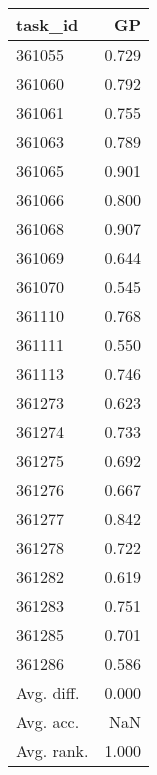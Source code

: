 \begin{tabular}{lr}
\toprule
task\_id & GP \\
\midrule
361055 & 0.729 \\
361060 & 0.792 \\
361061 & 0.755 \\
361063 & 0.789 \\
361065 & 0.901 \\
361066 & 0.800 \\
361068 & 0.907 \\
361069 & 0.644 \\
361070 & 0.545 \\
361110 & 0.768 \\
361111 & 0.550 \\
361113 & 0.746 \\
361273 & 0.623 \\
361274 & 0.733 \\
361275 & 0.692 \\
361276 & 0.667 \\
361277 & 0.842 \\
361278 & 0.722 \\
361282 & 0.619 \\
361283 & 0.751 \\
361285 & 0.701 \\
361286 & 0.586 \\
Avg. diff. & 0.000 \\
Avg. acc. & NaN \\
Avg. rank. & 1.000 \\
\bottomrule
\end{tabular}
